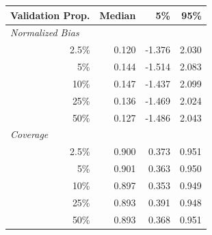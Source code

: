 
\begin{tabular}{r|rrr}
\toprule
Validation Prop. & Median & 5\% & 95\%\\
\midrule
\multicolumn{1}{l|}{\textit{Normalized Bias}}\\
2.5\% & 0.120 & -1.376 & 2.030\\
5\% & 0.144 & -1.514 & 2.083\\
10\% & 0.147 & -1.437 & 2.099\\
25\% & 0.136 & -1.469 & 2.024\\
50\% & 0.127 & -1.486 & 2.043\\
\midrule
%
\multicolumn{1}{l|}{\textit{Coverage}}\\
2.5\% & 0.900 & 0.373 & 0.951\\
5\% & 0.901 & 0.363 & 0.950\\
10\% & 0.897 & 0.353 & 0.949\\
25\% & 0.893 & 0.391 & 0.948\\
50\% & 0.893 & 0.368 & 0.951\\
\bottomrule
\end{tabular}
